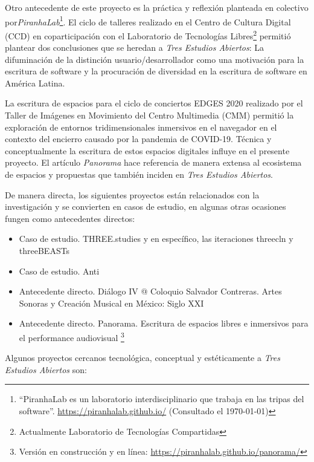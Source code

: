 Otro antecedente de este proyecto es la práctica y reflexión planteada en colectivo por\textit{PiranhaLab}\footnote{``PiranhaLab es un laboratorio interdisciplinario que trabaja en las tripas del software''. \url{https://piranhalab.github.io/} (Consultado el \today)}. El ciclo de talleres realizado en el Centro de Cultura Digital (CCD) en coparticipación con el Laboratorio de Tecnologías Libres\footnote{Actualmente Laboratorio de Tecnologías Compartidas} permitió plantear dos conclusiones que se heredan a \textit{Tres Estudios Abiertos}: La difuminación de la distinción usuario/desarrollador como una motivación para la escritura de software y la procuración de diversidad en la escritura de software en América Latina.

La escritura de espacios para el ciclo de conciertos EDGES 2020 realizado por el Taller de Imágenes en Movimiento del Centro Multimedia (CMM) permitió la exploración de entornos tridimensionales inmersivos en el navegador en el contexto del encierro causado por la pandemia de COVID-19. Técnica y conceptualmente la escritura de estos espacios digitales influye en el presente proyecto. El artículo \textit{Panorama} \citep{panoramaArticulo} hace referencia de manera extensa al ecosistema de espacios y propuestas que también inciden en \textit{Tres Estudios Abiertos}.

De manera directa, los siguientes proyectos están relacionados con la investigación y se convierten en casos de estudio, en algunas otras ocasiones fungen como antecedentes directos:

\begin{itemize}

\item Caso de estudio. THREE.studies \citep{threestudies} y en específico, las iteraciones threecln \citep{threecln} y threeBEASTs \citep{threeBEASTs}
\item Caso de estudio. Anti \citep{anti} 
\item Antecedente directo. Diálogo IV @ Coloquio Salvador Contreras. Artes Sonoras y Creación Musical en México: Siglo XXI \citep{dialogo}
\item Antecedente directo. Panorama. Escritura de espacios libres e inmersivos para el performance audiovisual \citep{panoramaArticulo}\footnote{Versión en construcción y en línea: \url{https://piranhalab.github.io/panorama/}}
  
\end{itemize}

Algunos proyectos cercanos tecnológica, conceptual y estéticamente a \textit{Tres Estudios Abiertos} son: 

